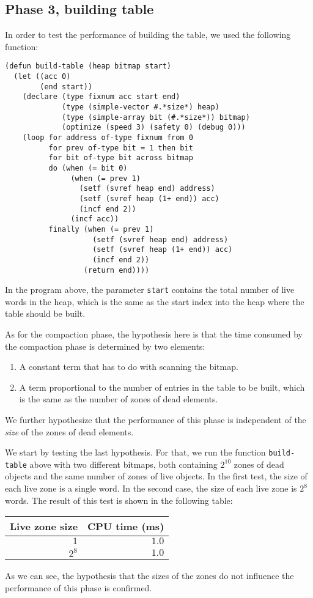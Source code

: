 \subsection{Phase 3, building table}

In order to test the performance of building the table, we used the
following function:

{\small\begin{verbatim}
(defun build-table (heap bitmap start)
  (let ((acc 0)
        (end start))
    (declare (type fixnum acc start end)
             (type (simple-vector #.*size*) heap)
             (type (simple-array bit (#.*size*)) bitmap)
             (optimize (speed 3) (safety 0) (debug 0)))
    (loop for address of-type fixnum from 0 
          for prev of-type bit = 1 then bit
          for bit of-type bit across bitmap
          do (when (= bit 0)
               (when (= prev 1)
                 (setf (svref heap end) address)
                 (setf (svref heap (1+ end)) acc)
                 (incf end 2))
               (incf acc))
          finally (when (= prev 1)
                    (setf (svref heap end) address)
                    (setf (svref heap (1+ end)) acc)
                    (incf end 2))
                  (return end))))
\end{verbatim}}

In the program above, the parameter \texttt{start} contains the total
number of live words in the heap, which is the same as the start index
into the heap where the table should be built. 

As for the compaction phase, the hypothesis here is that the time
consumed by the compaction phase is determined by two elements:

\begin{enumerate}
\item A constant term that has to do with scanning the bitmap.
\item A term proportional to the number of entries in the table to be
  built, which is the same as the number of zones of dead elements.
\end{enumerate}

We further hypothesize that the performance of this phase is
independent of the \emph{size} of the zones of dead elements. 

We start by testing the last hypothesis.  For that, we run the
function \texttt{build-table} above with two different bitmaps, both
containing $2^{10}$ zones of dead objects and the same number of zones
of live objects.  In the first test, the size of each live zone is a
single word.  In the second case, the size of each live zone is $2^8$
words.  The result of this test is shown in the following table:

\begin{tabular}{|r|r|}
\hline
Live zone size & CPU time (ms)\\
\hline
$1$ & $1.0$\\
$2^8$ & $1.0$\\
\hline
\end{tabular}

As we can see, the hypothesis that the sizes of the zones do not
influence the performance of this phase is confirmed.  
